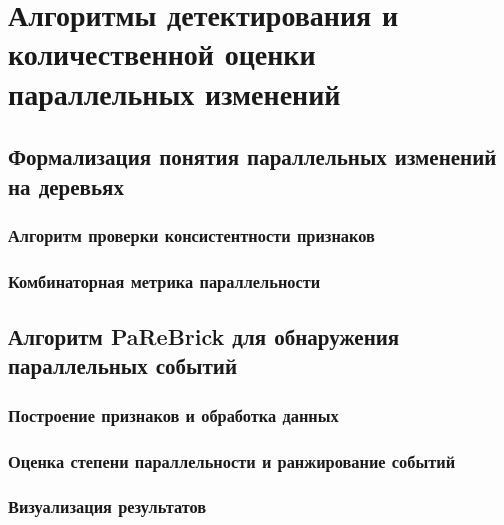 \chapter{Алгоритмы детектирования и количественной оценки параллельных изменений}
\label{chap:parallel_events}

\section{Формализация понятия параллельных изменений на деревьях}
\label{sec:parallel_changes_definition}

\subsection{Алгоритм проверки консистентности признаков}
\label{subsec:character_consistency}

\subsection{Комбинаторная метрика параллельности}
\label{subsec:parallelism_metric}

\section{Алгоритм PaReBrick для обнаружения параллельных событий}
\label{sec:parebrick_algorithm}

\subsection{Построение признаков и обработка данных}
\label{subsec:feature_construction}

\subsection{Оценка степени параллельности и ранжирование событий}
\label{subsec:parallel_events_ranking}

\subsection{Визуализация результатов}
\label{subsec:results_visualization}
